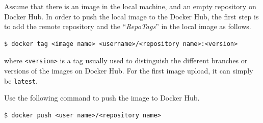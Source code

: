 Assume that there is an image in the local machine, and an empty repository on Docker Hub. In order to push the local image to the Docker Hub, the first step is to add the remote repository and the ``\textit{RepoTags}'' in the local image as follows.
\begin{lstlisting}
$ docker tag <image name> <username>/<repository name>:<version>
\end{lstlisting}
where \verb|<version>| is a tag usually used to distinguish the different branches or versions of the images on Docker Hub. For the first image upload, it can simply be \verb|latest|.

Use the following command to push the image to Docker Hub.
\begin{lstlisting}
$ docker push <user name>/<repository name>
\end{lstlisting}




